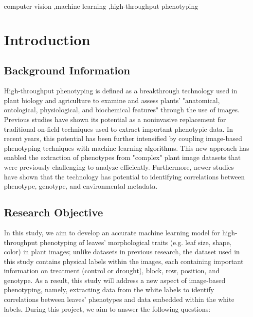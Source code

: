 \documentclass[final,5p,times,twocolumn,authoryear]{elsarticle}
\begin{document}
\begin{frontmatter}
\begin{keyword}
computer vision \sep machine learning \sep high-throughput phenotyping
\end{keyword}

\end{frontmatter}

\section{Introduction}
\label{intro}

\subsection{Background Information}
\label{background}

High-throughput phenotyping is defined as a breakthrough technology used in plant biology and agriculture to examine and assess plants' "anatomical, ontological, physiological, and biochemical features" through the use of images. Previous studies have shown its potential as a noninvasive replacement for traditional on-field techniques used to extract important phenotypic data. In recent years, this potential has been further intensified by coupling image-based phenotyping techniques with machine learning algorithms. This new approach has enabled the extraction of phenotypes from "complex" plant image datasets that were previously challenging to analyze efficiently. Furthermore, newer studies have shown that the technology has potential to identifying correlations between phenotype, genotype, and environmental metadata. 

\subsection{Research Objective}
\label{objective}

In this study, we aim to develop an accurate machine learning model for high-throughput phenotyping of leaves’ morphological traits (e.g. leaf size, shape, color) in plant images; unlike datasets in previous research, the dataset used in this study contains physical labels within the images, each containing important information on treatment (control or drought), block, row, position, and genotype. As a result, this study will address a new aspect of image-based phenotyping, namely, extracting data from the white labels to identify correlations between leaves’ phenotypes and data embedded within the white labels. During this project, we aim to answer the following questions: 
\end{document}
